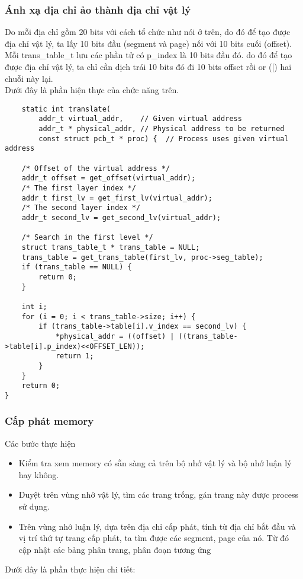 \documentclass[10pt]{article}
\newcommand\tab[1][1cm]{\hspace*{#1}}
\begin{document}
\subsubsection{Ánh xạ địa chỉ ảo thành địa chỉ vật lý}
\tab[0.5cm] Do mỗi địa chỉ gồm 20 bits với cách tổ chức như nói ở trên, do đó để tạo được địa chỉ vật lý, ta lấy 10 bits đầu (segment và page) nối với 10 bits cuối (offset). Mỗi trans\_table\_t lưu các phần tử có p\_index là 10 bits đầu đó. do đó để tạo được địa chỉ vật lý, ta chỉ cần dịch trái 10 bits đó đi 10 bits offset rồi or (|) hai chuỗi này lại. \\
\tab[0.5cm] Dưới đây là phần hiện thực của chức năng trên. 
\begin{lstlisting}
    static int translate(
        addr_t virtual_addr,    // Given virtual address
        addr_t * physical_addr, // Physical address to be returned
        const struct pcb_t * proc) {  // Process uses given virtual address

    /* Offset of the virtual address */
    addr_t offset = get_offset(virtual_addr);
    /* The first layer index */
    addr_t first_lv = get_first_lv(virtual_addr);
    /* The second layer index */
    addr_t second_lv = get_second_lv(virtual_addr);
    
    /* Search in the first level */
    struct trans_table_t * trans_table = NULL;
    trans_table = get_trans_table(first_lv, proc->seg_table);
    if (trans_table == NULL) {
        return 0;
    }

    int i;
    for (i = 0; i < trans_table->size; i++) {
        if (trans_table->table[i].v_index == second_lv) {
            *physical_addr = ((offset) | ((trans_table->table[i].p_index)<<OFFSET_LEN));
            return 1;
        }
    }
    return 0;   
}

\end{lstlisting}

\subsubsection{Cấp phát memory}
\tab[0.5cm] Các bước thực hiện 
\begin{itemize}
    \item Kiểm tra xem memory có sẵn sàng cả trên bộ nhớ vật lý và bộ nhớ luận lý hay không.
    \item Duyệt trên vùng nhớ vật lý, tìm các trang trống, gán trang này được process sử dụng.
    \item Trên vùng nhớ luận lý, dựa trên địa chỉ cấp phát, tính từ địa chỉ bắt đầu và vị trí thứ tự trang cấp phát, ta tìm được các segment, page của nó. Từ đó cập nhật các bảng phân trang, phân đoạn tương ứng
\end{itemize}
\tab[0.5cm] Dưới đây là phần thực hiện chi tiết:\\
\end{document}
